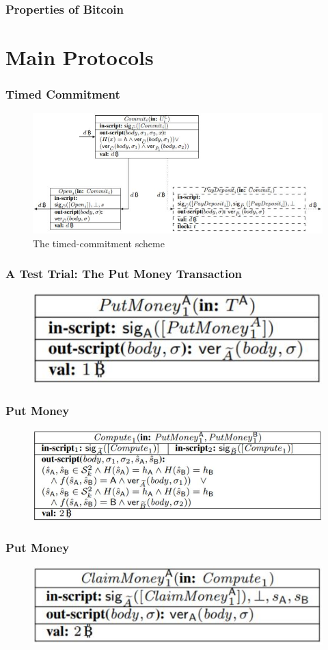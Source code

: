 \documentclass{beamer}
\begin{document}
\begin{frame}\frametitle{Properties of Bitcoin} 

\end{frame}



\section{Main Protocols}

\begin{frame}\frametitle{Timed Commitment} 
\begin{figure}
	\includegraphics[width=4.6 in]{myfigs/timed-commitment.jpg}
	\caption{The timed-commitment scheme}
\end{figure}
\end{frame}


\begin{frame}\frametitle{A Test Trial: The Put Money Transaction}
\begin{figure}
	\includegraphics[width=2.2 in]{myfigs/PutMoney1.jpg}
\end{figure}
\end{frame}

\begin{frame}\frametitle{Put Money}
\begin{figure}
	\includegraphics[width=3 in, height=1.2 in]{myfigs/Compute1.jpg}
\end{figure}

\end{frame}
\begin{frame}\frametitle{Put Money}
\begin{figure}
	\includegraphics[width=2 in]{myfigs/ClaimMoney1.jpg}
\end{figure}

\end{frame}
\end{document}
